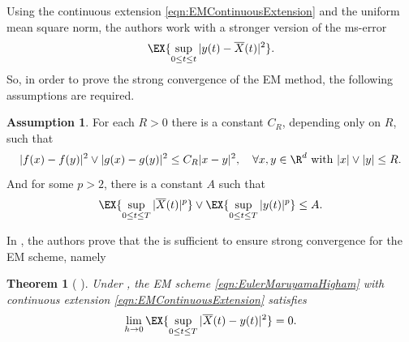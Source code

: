 \documentclass[sort&compress, preprint]{elsarticle}
\theoremstyle{definition}
\newtheorem{assumption}{Assumption}[section]
\theoremstyle{plain}%
\newtheorem{thm}{Theorem}[section]
\theoremstyle{remark}
\begin{document}
	Using the continuous extension \eqref{eqn:EMContinuousExtension} %
and the uniform mean square norm, the authors work with a stronger version of the ms-error%
$$
	\EX{\sup_{0\leq t \leq t}|y(t)-\overline{X}(t)|^2}.
$$
%
So, in  order to prove the strong convergence of the EM method, the following assumptions are required.
\begin{assumption}\label{ass:HighamAssumption}
	For each $R>0$ there is a constant $C_R$, depending only on $R$, such that
	\begin{equation}\label{ass:LipschitzCondition}
		|f(x)-f(y)|^2 \vee |g(x)-g(y)|^2 \leq C_R|x-y|^2,
		\quad
		\forall x,y\in \R^d 
		\text{ with } |x|\vee |y|\leq R.
	\end{equation}
	And for some $p>2$, there is a constant $A$ such that
	\begin{equation}
		\EX{\sup_{0\leq t\leq T}|\overline{X}(t)|^p}
		\vee
		\EX{\sup_{0\leq t\leq T}|y(t)|^p} \leq A.
	\end{equation}
\end{assumption}
In \cite{Higham2002b}, the authors prove that the  is sufficient to ensure strong 
convergence for the EM scheme, namely 
\begin{thm}[
	{\cite[Thm 2.2]{Higham2002b}}
	]\label{thm:HighamMaoStuart}
	Under , the EM scheme \eqref{eqn:EulerMaruyamaHigham} with continuous extension
	\eqref{eqn:EMContinuousExtension}
	satisfies
	\begin{equation}
		\lim_{h\to 0}
		\EX{\sup_{0\leq t\leq T}|\overline{X}(t)-y(t)|^2}=0.
	\end{equation}
\end{thm}
	
\end{document}
